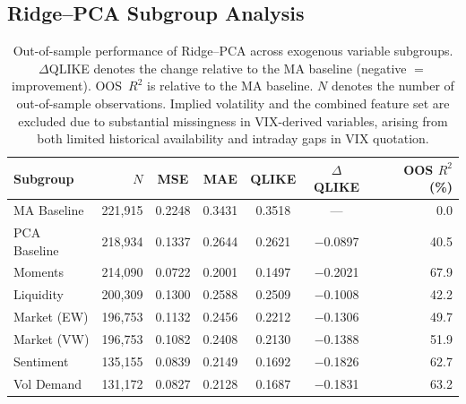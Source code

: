 \subsection{Ridge--PCA Subgroup Analysis}
\label{sec:results_ridge_pca}

\begin{table}[H]
\centering
\caption{Out-of-sample performance of Ridge--PCA across exogenous variable subgroups. $\Delta$QLIKE denotes the change relative to the MA baseline (negative $=$ improvement). OOS~$R^2$ is relative to the MA baseline. $N$ denotes the number of out-of-sample observations. Implied volatility and the combined feature set are excluded due to substantial missingness in VIX-derived variables, arising from both limited historical availability and intraday gaps in VIX quotation.}
\label{tab:ridge_pca_subgroup}
\begin{tabular}{lrccccr}
\toprule
Subgroup & $N$ & MSE & MAE & QLIKE & $\Delta$QLIKE & OOS $R^2$ (\%) \\
\midrule
MA Baseline      & 221{,}915 & 0.2248 & 0.3431 & 0.3518 & ---       & 0.0 \\
PCA Baseline     & 218{,}934 & 0.1337 & 0.2644 & 0.2621 & $-$0.0897 & 40.5 \\
Moments          & 214{,}090 & 0.0722 & 0.2001 & 0.1497 & $-$0.2021 & 67.9 \\
Liquidity        & 200{,}309 & 0.1300 & 0.2588 & 0.2509 & $-$0.1008 & 42.2 \\
Market (EW)      & 196{,}753 & 0.1132 & 0.2456 & 0.2212 & $-$0.1306 & 49.7 \\
Market (VW)      & 196{,}753 & 0.1082 & 0.2408 & 0.2130 & $-$0.1388 & 51.9 \\
Sentiment        & 135{,}155 & 0.0839 & 0.2149 & 0.1692 & $-$0.1826 & 62.7 \\
Vol Demand       & 131{,}172 & 0.0827 & 0.2128 & 0.1687 & $-$0.1831 & 63.2 \\
\bottomrule
\end{tabular}
\end{table}